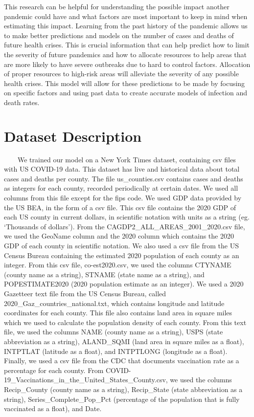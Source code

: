\documentclass[fontsize=11pt]{article}
\begin{document}
    This research can be helpful for understanding the possible impact another pandemic could have and what factors are most important to keep in mind when estimating this impact. Learning from the past history of the pandemic allows us to make better predictions and models on the number of cases and deaths of future health crises. This is crucial information that can help predict how to limit the severity of future pandemics and how to allocate resources to help areas that are more likely to have severe outbreaks due to hard to control factors. Allocation of proper resources to high-risk areas will alleviate the severity of any possible health crises. This model will allow for these predictions to be made by focusing on specific factors and using past data to create accurate models of infection and death rates.


    \section*{Dataset Description}
    ~~~~We trained our model on a New York Times dataset, containing csv files with US COVID-19 data. This dataset has live and historical data about total cases and deaths per county. The file us\_counties.csv contains cases and deaths as integers for each county, recorded periodically at certain dates. We used all columns from this file except for the fips code. We used GDP data provided by the US BEA, in the form of a csv file. This csv file contains the 2020 GDP of each US county in current dollars, in scientific notation with units as a string (eg. ‘Thousands of dollars’). From the CAGDP2\_ALL\_AREAS\_2001\_2020.csv file, we used the GeoName column and the 2020 column which contains the 2020 GDP of each county in scientific notation. We also used a csv file from the US Census Bureau containing the estimated 2020 population of each county as an integer. From this csv file, co-est2020.csv, we used the columns CTYNAME (county name as a string), STNAME (state name as a string), and POPESTIMATE2020 (2020 population estimate as an integer). We used a 2020 Gazetteer text file from the US Census Bureau, called 2020\_Gaz\_countries\_national.txt, which contains longitude and latitude coordinates for each county. This file also contains land area in square miles which we used to calculate the population density of each county. From this text file, we used the columns NAME (county name as a string), USPS (state abbreviation as a string), ALAND\_SQMI (land area in square miles as a float), INTPTLAT (latitude as a float), and INTPTLONG (longitude as a float). Finally, we used a csv file from the CDC that documents vaccination rate as a percentage for each county. From COVID-19\_Vaccinations\_in\_the\_United\_States\_County.csv, we used the columns Recip\_County (county name as a string), Recip\_State (state abbreviation as a string), Series\_Complete\_Pop\_Pct (percentage of the population that is fully vaccinated as a float), and Date. \par
\end{document}
